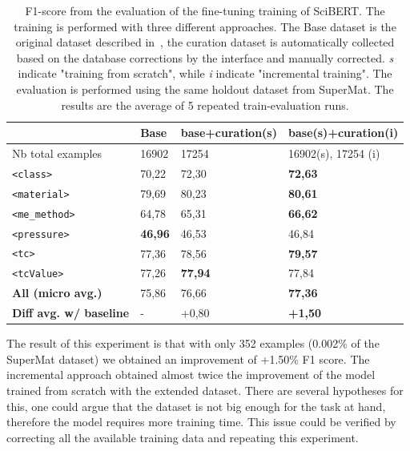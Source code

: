 \documentclass[a4paper]{article}
\begin{document}
\begin{table}[ht]
\centering
\begin{tabular}{|l|l|l|l|}
\hline
& \textbf{Base} & \textbf{base+curation(s)} & \textbf{base(s)+curation(i)} \\ 
\hline
\hline
Nb total examples & 16902 & 17254 & 16902(s), 17254 (i)\\ 
\hline
\texttt{<class>}        & 70,22             & 72,30             & \textbf{72,63} \\ 
\texttt{<material>}     & 79,69             & 80,23             & \textbf{80,61} \\ 
\texttt{<me\_method>}   & 64,78             & 65,31             & \textbf{66,62} \\ 
\texttt{<pressure>}     & \textbf{46,96}    & 46,53             & 46,84 \\ 
\texttt{<tc>}           & 77,36             & 78,56             & \textbf{79,57} \\ 
\texttt{<tcValue>}      & 77,26             & \textbf{77,94}    & 77,84 \\ 
\hline
\textbf{All (micro avg.)} & 75,86           & 76,66             & \textbf{77,36} \\ 
\hline
\textbf{Diff avg. w/ baseline}& -           & +0,80             & \textbf{+1,50} \\ 
\hline
\end{tabular}
\caption{F1-score from the evaluation of the fine-tuning training of SciBERT. 
The training is performed with three different approaches. 
The Base dataset is the original dataset described in~\cite{lfoppiano2023automatic}, the curation dataset is automatically collected based on the database corrections by the interface and manually corrected. \textit{s} indicate "training from scratch", while \textit{i} indicate "incremental training". 
The evaluation is performed using the same holdout dataset from SuperMat. 
The results are the average of 5 repeated train-evaluation runs. }
\label{tab:evaluation-curation-training}
\end{table}

The result of this experiment is that with only 352 examples (0.002\% of the SuperMat dataset) we obtained an improvement of +1.50\% F1 score. The incremental approach obtained almost twice the improvement of the model trained from scratch with the extended dataset. 
There are several hypotheses for this, one could argue that the dataset is not big enough for the task at hand, therefore the model requires more training time. This issue could be verified by correcting all the available training data and repeating this experiment. 
\end{document}
